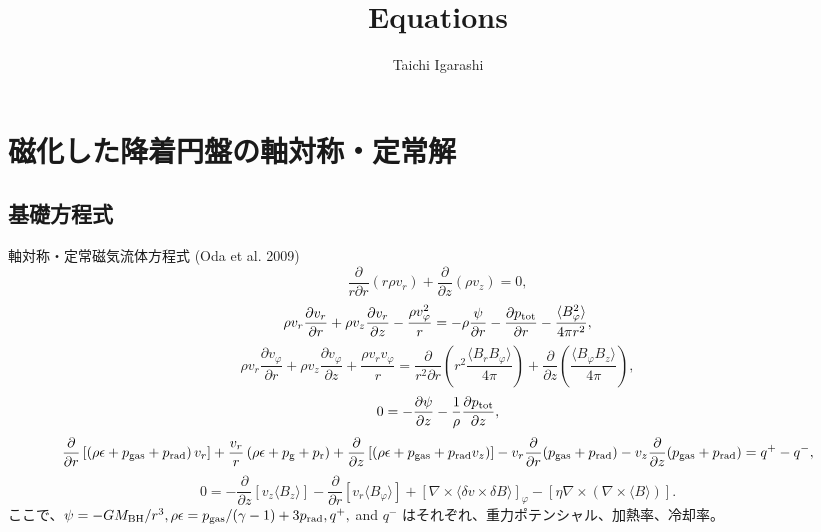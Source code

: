 \documentclass[11pt, oneside]{article}   	%
\title{Equations}
\author{Taichi Igarashi}
\begin{document}
\maketitle
\section{磁化した降着円盤の軸対称・定常解}
\subsection{基礎方程式}
軸対称・定常磁気流体方程式 (Oda et al. 2009)
\begin{equation}
	\frac{\partial}{r\partial r}\left( r\rho v_r \right) + \frac{\partial}{\partial z} (\rho v_z) = 0,
\end{equation}
\begin{equation}
	\rho v_r\frac{\partial v_r}{\partial r} + \rho v_z\frac{\partial v_r}{\partial z} - \frac{\rho v_\varphi^2}{r} = -\rho\frac{\psi}{\partial r} - \frac{\partial p_{\rm tot}}{\partial r} - \frac{\langle B_\varphi^2 \rangle}{4\pi r^2},
\end{equation}
\begin{equation}
	\rho v_r\frac{\partial v_\varphi}{\partial r} + \rho v_z\frac{\partial v_\varphi}{\partial z} + \frac{\rho v_rv_\varphi}{r} = \frac{\partial}{r^2\partial r}\left( r^2\frac{\langle B_rB_\varphi \rangle}{4\pi} \right) + \frac{\partial}{\partial z}\left( \frac{\langle B_\varphi B_z \rangle}{4\pi}\right),
\end{equation}
\begin{equation}
	0 = -\frac{\partial \psi}{\partial z} - \frac{1}{\rho}\frac{\partial p_{\rm tot}}{\partial z},
\end{equation}
\begin{equation}
	\frac{\partial}{\partial r}\left[\left( \rho\epsilon + p_{\rm gas} + p_{\rm rad} \right)v_r\right] + \frac{v_r}{r}\left( \rho\epsilon + p_{\rm g} + p_{\rm r} \right) + \frac{\partial}{\partial z}\left[\left( \rho\epsilon + p_{\rm gas} + p_{\rm rad}v_z \right)\right] - v_r\frac{\partial}{\partial r}(p_{\rm gas}+p_{\rm rad}) - v_z\frac{\partial}{\partial z}(p_{\rm gas}+p_{\rm rad}) = q^+ - q^-,
\end{equation}
\begin{equation}
	0 = -\frac{\partial}{\partial z}\left[ v_z\langle B_z \rangle \right] - \frac{\partial}{\partial r}\left[ v_r \langle B_\varphi \rangle\right] + \left[ \nabla\times \langle \delta{v} \times \delta{B} \rangle\right]_\varphi - \left[ \eta\nabla\times\left( \nabla\times\langle{B}\rangle \right)\right].
\end{equation}
ここで、$\psi=-GM_{\rm BH}/r^3, \rho\epsilon=p_{\rm gas}/(\gamma-1) + 3p_{\rm rad}, q^+,$ and $q^-$ はそれぞれ、重力ポテンシャル、加熱率、冷却率。
\end{document}
